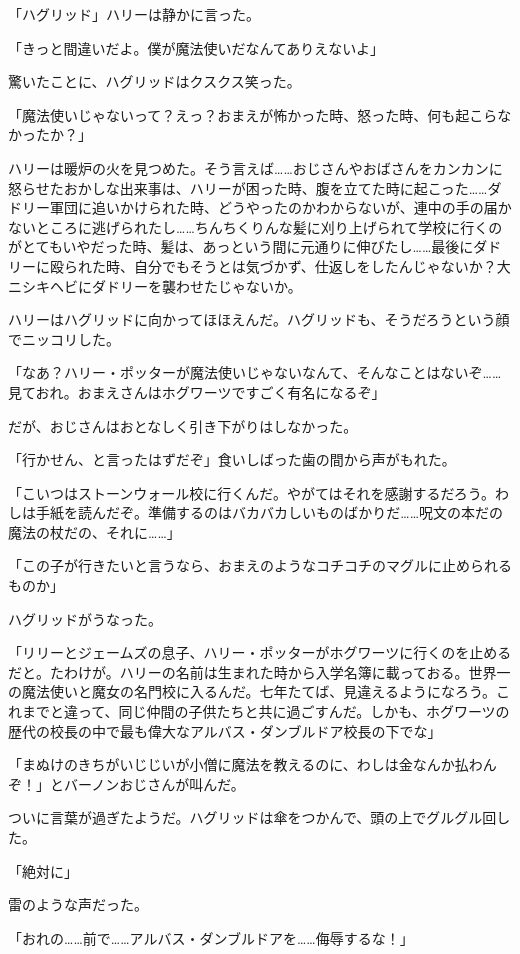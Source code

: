 \documentclass[10pt,a4paper]{article}
\begin{document}
\begin{CJK}{UTF8}{min}
「ハグリッド」ハリーは静かに言った。

「きっと間違いだよ。僕が魔法使いだなんてありえないよ」

驚いたことに、ハグリッドはクスクス笑った。

「魔法使いじゃないって？えっ？おまえが怖かった時、怒った時、何も起こらなかったか？」

ハリーは暖炉の火を見つめた。そう言えば……おじさんやおばさんをカンカンに怒らせたおかしな出来事は、ハリーが困った時、腹を立てた時に起こった……ダドリー軍団に追いかけられた時、どうやったのかわからないが、連中の手の届かないところに逃げられたし……ちんちくりんな髪に刈り上げられて学校に行くのがとてもいやだった時、髪は、あっという間に元通りに伸びたし……最後にダドリーに殴られた時、自分でもそうとは気づかず、仕返しをしたんじゃないか？大ニシキヘビにダドリーを襲わせたじゃないか。

ハリーはハグリッドに向かってほほえんだ。ハグリッドも、そうだろうという顔でニッコリした。

「なあ？ハリー・ポッターが魔法使いじゃないなんて、そんなことはないぞ……見ておれ。おまえさんはホグワーツですごく有名になるぞ」

だが、おじさんはおとなしく引き下がりはしなかった。

「行かせん、と言ったはずだぞ」食いしばった歯の間から声がもれた。

「こいつはストーンウォール校に行くんだ。やがてはそれを感謝するだろう。わしは手紙を読んだぞ。準備するのはバカバカしいものばかりだ……呪文の本だの魔法の杖だの、それに……」

「この子が行きたいと言うなら、おまえのようなコチコチのマグルに止められるものか」

ハグリッドがうなった。

「リリーとジェームズの息子、ハリー・ポッターがホグワーツに行くのを止めるだと。たわけが。ハリーの名前は生まれた時から入学名簿に載っておる。世界一の魔法使いと魔女の名門校に入るんだ。七年たてば、見違えるようになろう。これまでと違って、同じ仲間の子供たちと共に過ごすんだ。しかも、ホグワーツの歴代の校長の中で最も偉大なアルバス・ダンブルドア校長の下でな」

「まぬけのきちがいじじいが小僧に魔法を教えるのに、わしは金なんか払わんぞ！」とバーノンおじさんが叫んだ。

ついに言葉が過ぎたようだ。ハグリッドは傘をつかんで、頭の上でグルグル回した。

「絶対に」

雷のような声だった。

「おれの……前で……アルバス・ダンブルドアを……侮辱するな！」


\end{CJK}
\end{document}
